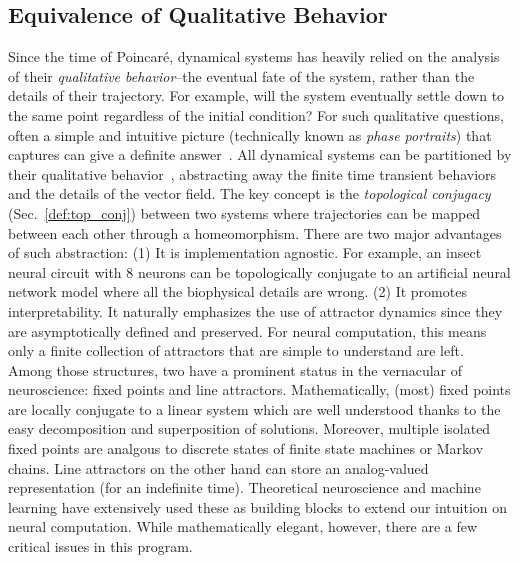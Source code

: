 \documentclass{article}
\theoremstyle{definition} \newtheorem{definition}{Definition}  \newtheorem{example}{Example}
\theoremstyle{remark} \newtheorem{remark}{Remark}
\newcounter{ct}
\begin{document}
\subsection{Equivalence of Qualitative Behavior}
Since the time of Poincar\'e, dynamical systems has heavily relied on the analysis of their \emph{qualitative behavior}--the eventual fate of the system, rather than the details of their trajectory.
For example, will the system eventually settle down to the same point regardless of the initial condition?
For such qualitative questions, often a simple and intuitive picture (technically known as \emph{phase portraits}) that captures can give a definite answer~\citep{Strogatz2000-tf}.
All dynamical systems can be partitioned by their qualitative behavior~\citep{Arnold1994}, abstracting away the finite time transient behaviors and the details of the vector field.
The key concept is the \emph{topological conjugacy} (Sec.~\ref{def:top_conj}) between two systems where trajectories can be mapped between each other through a homeomorphism. %
There are two major advantages of such abstraction:
(1) It is implementation agnostic. For example, an insect neural circuit with 8 neurons can be topologically conjugate to an artificial neural network model where all the biophysical details are wrong.
(2) It promotes interpretability.
It naturally emphasizes the use of attractor dynamics since they are asymptotically defined and preserved.
For neural computation, this means only a finite collection of attractors that are simple to understand are left.
Among those structures, two have a prominent status in the vernacular of neuroscience: fixed points and line attractors.
Mathematically, (most) fixed points are locally conjugate to a linear system\citep{hartman1960lemma} which are well understood thanks to the easy decomposition and superposition of solutions.
Moreover, multiple isolated fixed points are analgous to discrete states of finite state machines or Markov chains.
Line attractors on the other hand can store an analog-valued representation (for an indefinite time).
Theoretical neuroscience and machine learning have extensively used these as building blocks to extend our intuition on neural computation.
While mathematically elegant, however, there are a few critical issues in this program.
\end{document}
